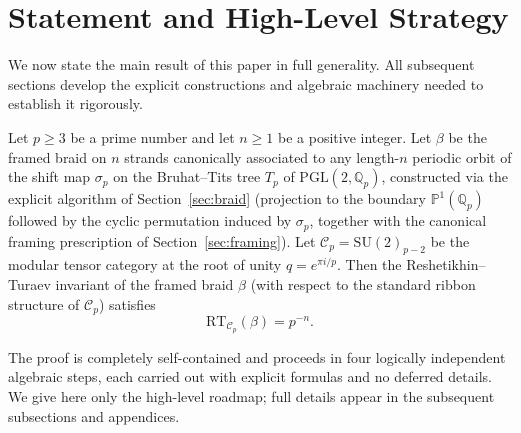 \section{Statement and High-Level Strategy}
\label{sec:statement}

We now state the main result of this paper in full generality. All subsequent sections develop the explicit constructions and algebraic machinery needed to establish it rigorously.

\begin{theorem}
\label{thm:main}
Let \(p \geq 3\) be a prime number and let \(n \geq 1\) be a positive integer. Let \(\beta\) be the framed braid on \(n\) strands canonically associated to any length-\(n\) periodic orbit of the shift map \(\sigma_p\) on the Bruhat--Tits tree \(T_p\) of \(\mathrm{PGL}(2,\mathbb{Q}_p)\), constructed via the explicit algorithm of Section~\ref{sec:braid} (projection to the boundary \(\mathbb{P}^1(\mathbb{Q}_p)\) followed by the cyclic permutation induced by \(\sigma_p\), together with the canonical framing prescription of Section~\ref{sec:framing}). Let \(\mathcal{C}_p = \mathrm{SU}(2)_{p-2}\) be the modular tensor category at the root of unity \(q = e^{\pi i / p}\). Then the Reshetikhin--Turaev invariant of the framed braid \(\beta\) (with respect to the standard ribbon structure of \(\mathcal{C}_p\)) satisfies
\[
\mathrm{RT}_{\mathcal{C}_p}(\beta) = p^{-n}.
\]
\end{theorem}

The proof is completely self-contained and proceeds in four logically independent algebraic steps, each carried out with explicit formulas and no deferred details. We give here only the high-level roadmap; full details appear in the subsequent subsections and appendices.

